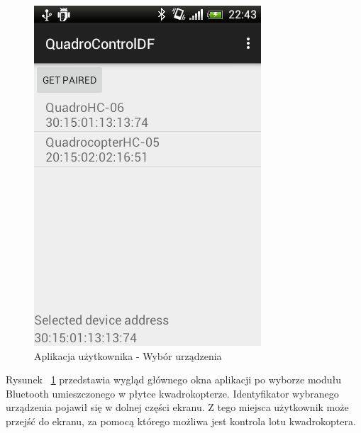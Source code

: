 \begin{figure}[H]
	\centering
	\includegraphics[scale=0.6]{Pictures/DroidAtScreen/droid@screen-3.png}
	\caption[Aplikacja użytkownika - Ekran startory]{Aplikacja użytkownika - Wybór urządzenia}
	\label{fig:QuadroControl_screen3}
\end{figure}

Rysunek ~\ref{fig:QuadroControl_screen3} przedstawia wygląd głównego okna aplikacji po wyborze modułu Bluetooth umieszczonego w płytce kwadrokopterze. Identyfikator wybranego urządzenia pojawił się w dolnej części ekranu. Z tego miejsca użytkownik może przejść do ekranu, za pomocą którego możliwa jest kontrola lotu kwadrokoptera.

